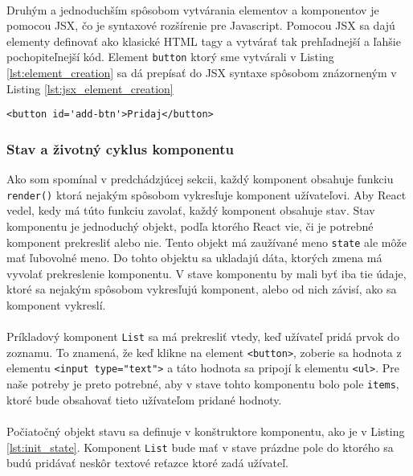 \paragraph{}
Druhým a jednoduchším spôsobom vytvárania elementov a komponentov je pomocou JSX, čo je syntaxové rozšírenie pre Javascript. Pomocou JSX sa dajú elementy definovať ako klasické HTML tagy a vytvárať tak prehľadnejší a ľahšie pochopiteľnejší kód. Element \texttt{button} ktorý sme vytvárali v Listing \ref{lst:element_creation} sa dá prepísať do JSX syntaxe spôsobom znázorneným v Listing \ref{lst:jsx_element_creation}
\begin{lstlisting}[caption={Vytvorenie elementu pomocou JSX}, label={lst:jsx_element_creation}]
<button id='add-btn'>Pridaj</button>
\end{lstlisting}




\subsubsection{Stav a  životný cyklus komponentu}
Ako som spomínal v predchádzjúcej sekcii, každý komponent obsahuje funkciu \texttt{render()} ktorá nejakým spôsobom vykresľuje komponent užívateľovi. Aby React vedel, kedy má túto funkciu zavolať, každý komponent obsahuje stav.  Stav komponentu je jednoduchý objekt, podľa ktorého React vie, či je potrebné komponent prekresliť alebo nie. Tento objekt má zaužívané meno \texttt{state} ale môže mať ľubovolné meno. Do tohto objektu sa ukladajú dáta, ktorých zmena má vyvolať prekreslenie komponentu. V stave komponentu by mali byť iba tie údaje, ktoré sa nejakým spôsobom vykresľujú komponent, alebo od nich závisí, ako sa komponent vykreslí. 

\paragraph{}
Príkladový komponent \texttt{List} sa má prekresliť vtedy, keď užívateľ pridá prvok do zoznamu. To znamená, že keď klikne na element \texttt{<button>}, zoberie sa hodnota z elementu \texttt{<input type="text">} a táto hodnota sa pripojí k elementu \texttt{<ul>}. Pre naše potreby je preto potrebné, aby v stave tohto komponentu bolo pole \texttt{items}, ktoré bude obsahovať tieto užívateľom pridané hodnoty.

\paragraph{}
Počiatočný objekt stavu sa definuje v konštruktore komponentu, ako je v Listing \ref{lst:init_state}. Komponent \texttt{List} bude mať v stave prázdne pole do ktorého sa budú pridávať neskôr textové reťazce ktoré zadá užívateľ.


